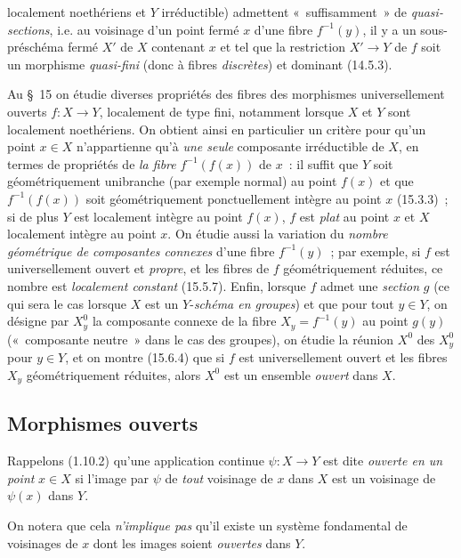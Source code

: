 localement noethériens et $Y$ irréductible) admettent «~suffisamment~» de
\emph{quasi-sections}, i.e. au voisinage d'un point fermé $x$ d'une fibre
$f^{-1}(y)$, il y a un sous-préschéma fermé $X'$ de $X$ contenant $x$ et tel que
la restriction $X'\to Y$ de $f$ soit un morphisme \emph{quasi-fini} (donc à fibres
\emph{discrètes}) et dominant (14.5.3).

Au \S~15 on étudie diverses propriétés des fibres des morphismes universellement
ouverts $f:X\to Y$, localement de type fini, notamment lorsque $X$ et $Y$ sont
localement noethériens. On obtient ainsi en particulier un critère pour qu'un
point $x\in X$ n'appartienne qu'à \emph{une seule} composante irréductible de $X$,
en termes de propriétés de \emph{la fibre} $f^{-1}(f(x))$ de $x$~: il suffit que
$Y$ soit géométriquement unibranche (par exemple normal) au point $f(x)$ et que
$f^{-1}(f(x))$ soit géométriquement ponctuellement intègre au point $x$ (15.3.3)~;
si de plus $Y$ est localement intègre au point $f(x)$, $f$ est \emph{plat} au point
$x$ et $X$ localement intègre au point $x$. On étudie aussi la variation du
\emph{nombre géométrique de composantes connexes} d'une fibre $f^{-1}(y)$~; par
exemple, si $f$ est universellement ouvert et \emph{propre}, et les fibres de $f$
géométriquement réduites, ce nombre est \emph{localement constant} (15.5.7).
Enfin, lorsque $f$ admet une \emph{section} $g$ (ce qui sera le cas lorsque $X$ est
un $Y$-\emph{schéma en groupes}) et que pour tout $y\in Y$, on désigne par $X_y^0$
la composante connexe de la fibre $X_y=f^{-1}(y)$ au point $g(y)$ («~composante
neutre~» dans le cas des groupes), on étudie la réunion $X^0$ des $X_y^0$ pour
$y\in Y$, et on montre (15.6.4) que si $f$ est universellement ouvert et les fibres
$X_y$ géométriquement réduites, alors $X^0$ est un ensemble \emph{ouvert} dans $X$.

\subsection{Morphismes ouverts}
\label{subsection:IV.14.1-fr}

\begin{env}[14.1.1]
\label{IV.14.1.1-fr}
Rappelons (1.10.2) qu'une application continue $\psi:X\to Y$ est dite
\emph{ouverte en un point} $x\in X$ si l'image par $\psi$ de \emph{tout} voisinage
de $x$ dans $X$ est un voisinage de $\psi(x)$ dans $Y$.

On notera que cela \emph{n'implique pas} qu'il existe un système fondamental de
voisinages de $x$ dont les images soient \emph{ouvertes} dans $Y$.
\end{env}

